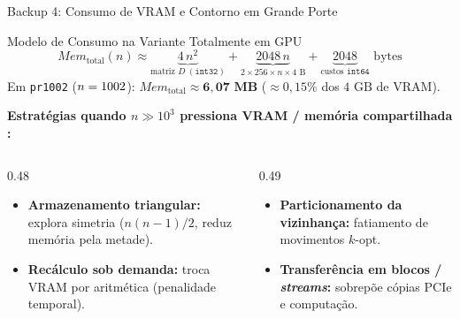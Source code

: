 \begin{frame}{Backup 4: Consumo de VRAM e Contorno em Grande Porte}
  \begin{block}{Modelo de Consumo na Variante Totalmente em GPU}
    \[
      Mem_{\text{total}}(n) \approx \underbrace{4\,n^2}_{\text{matriz } D\;(\texttt{int32})} + \underbrace{2048\,n}_{2 \times 256 \times n \times 4\text{ B}} + \underbrace{2048}_{\text{custos }\texttt{int64}} \text{ bytes}
    \]
    \centering
    {\footnotesize Em \texttt{pr1002} ($n = 1002$): $Mem_{\text{total}} \approx \mathbf{6{,}07\text{ MB}}$ ($\approx 0{,}15\%$ dos $4\text{ GB}$ de VRAM).}
  \end{block}

  \vspace{0.12cm}
  {\footnotesize \textbf{Estratégias quando $n \gg 10^3$ pressiona VRAM / memória compartilhada \autocite{schulz2013gpu,oneil2015rethinking}:}}
  \begin{columns}[T,onlytextwidth]
    \begin{column}{0.48\textwidth}
      \begin{itemize}
        \item \textbf{Armazenamento triangular:} explora simetria ($n(n-1)/2$, reduz memória pela metade).
        \item \textbf{Recálculo sob demanda:} troca VRAM por aritmética (penalidade temporal).
      \end{itemize}
    \end{column}
    \begin{column}{0.49\textwidth}
      \begin{itemize}
        \item \textbf{Particionamento da vizinhança:} fatiamento de movimentos $k$-opt.
        \item \textbf{Transferência em blocos / \emph{streams}:} sobrepõe cópias PCIe e computação.
      \end{itemize}
    \end{column}
  \end{columns}
\end{frame}

